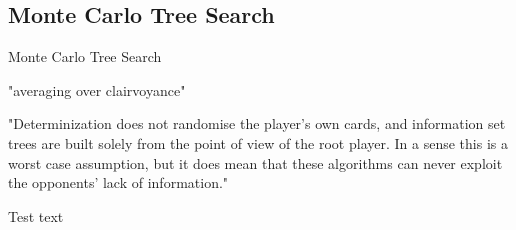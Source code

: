 \subsection{Monte Carlo Tree Search}

Monte Carlo Tree Search \cite{Chaslot10}

"averaging over clairvoyance" \cite{Russell09}

"Determinization does not randomise the
player's own cards, and information set trees are built solely
from the point of view of the root player. In a sense this is a
worst case assumption, but it does mean that these
algorithms can never exploit the opponents' lack of
information." \cite{Whitehouse11}

Test text
